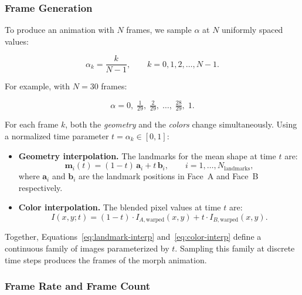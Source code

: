 \subsubsection{Frame Generation}

To produce an animation with $N$ frames, we sample $\alpha$ at $N$ uniformly spaced values:

\begin{equation}
    \alpha_k = \frac{k}{N - 1}, \qquad k = 0, 1, 2, \ldots, N - 1.
\end{equation}

For example, with $N = 30$ frames:

\begin{equation}
    \alpha = 0,\; \tfrac{1}{29},\; \tfrac{2}{29},\; \ldots,\; \tfrac{28}{29},\; 1.
\end{equation}

For each frame $k$, both the \emph{geometry} and the \emph{colors} change simultaneously.
Using a normalized time parameter $t = \alpha_k \in [0, 1]$:

\begin{itemize}
    \item \textbf{Geometry interpolation.} The landmarks for the mean shape at time $t$ are:
          \begin{equation}
              \label{eq:landmark-interp}
              \mathbf{m}_i(t) = (1 - t)\, \mathbf{a}_i + t\, \mathbf{b}_i,
              \qquad i = 1, \ldots, N_{\text{landmarks}},
          \end{equation}
          where $\mathbf{a}_i$ and $\mathbf{b}_i$ are the landmark positions in Face~A and
          Face~B respectively.
    \item \textbf{Color interpolation.} The blended pixel values at time $t$ are:
          \begin{equation}
              \label{eq:color-interp}
              I(x, y; t) = (1 - t) \cdot I_{A,\text{warped}}(x, y)
                         + t \cdot I_{B,\text{warped}}(x, y).
          \end{equation}
\end{itemize}

Together, Equations~\eqref{eq:landmark-interp} and~\eqref{eq:color-interp} define a continuous
family of images parameterized by $t$. Sampling this family at discrete time steps produces the
frames of the morph animation.

\subsubsection{Frame Rate and Frame Count}

